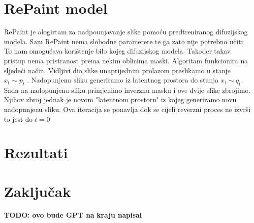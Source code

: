 \documentclass[10pt, a4paper, croatian]{article}
\begin{document}
\section{RePaint model}
RePaint je alogirtam za nadpounjavanje slike pomoću predtreniranog difuzijskog modela. Sam RePaint nema slobodne parametere te ga zato nije
potrebno učiti. To nam omogućava korištenje bilo kojeg difuzijskog modela. Također takav pristup nema pristranost prema nekim oblicima maski. 
Algoritam funkcionira na sljedeći način. Vidljivi dio slike unaprijednim prolazom preslikamo u stanje $x_t \sim p_t$ . Nadopunjenu sliku 
generiramo iz latentnog prostora do stanja $x_t \sim q_t$. Sada na nadopunjenu sliku primjenimo inverznu masku i ove dvije slike zbrojimo. 
Njihov zbroj jednak je novom "latentnom prostoru" iz kojeg generiramo novu nadopunjenu sliku. Ova iteracija se ponavlja dok se cijeli reverzni
proces ne izvrši to jest do $t = 0$

\section{Rezultati}

\section{Zaključak}

\textbf{TODO: ovo bude GPT na kraju napisal}



 
\end{document}
